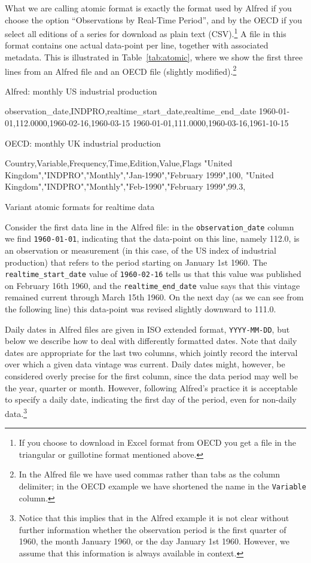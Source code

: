 What we are calling atomic format is exactly the format used by Alfred
if you choose the option ``Observations by Real-Time Period'', and by
the OECD if you select all editions of a series for download as plain
text (CSV).\footnote{If you choose to download in Excel format from
  OECD you get a file in the triangular or guillotine format mentioned
  above.} A file in this format contains one actual data-point per
line, together with associated metadata. This is illustrated in
Table~\ref{tab:atomic}, where we show the first three lines from an
Alfred file and an OECD file (slightly modified).\footnote{In the
  Alfred file we have used commas rather than tabs as the column
  delimiter; in the OECD example we have shortened the name in the
  \texttt{Variable} column.}

\begin{table}[htbp]
\begin{center}
Alfred: monthly US industrial production
\begin{code}
observation_date,INDPRO,realtime_start_date,realtime_end_date
1960-01-01,112.0000,1960-02-16,1960-03-15
1960-01-01,111.0000,1960-03-16,1961-10-15
\end{code}
OECD: monthly UK industrial production
\begin{code}
Country,Variable,Frequency,Time,Edition,Value,Flags
"United Kingdom","INDPRO","Monthly","Jan-1990","February 1999",100,
"United Kingdom","INDPRO","Monthly","Feb-1990","February 1999",99.3,
\end{code}
\end{center}
\caption{Variant atomic formats for realtime data}
\label{tab:atomic}
\end{table}

Consider the first data line in the Alfred file: in the
\verb|observation_date| column we find \texttt{1960-01-01}, indicating
that the data-point on this line, namely 112.0, is an observation or
measurement (in this case, of the US index of industrial production)
that refers to the period starting on January 1st 1960. The
\verb|realtime_start_date| value of \texttt{1960-02-16} tells us that
this value was published on February 16th 1960, and the
\verb|realtime_end_date| value says that this vintage remained current
through March 15th 1960. On the next day (as we can see from the
following line) this data-point was revised slightly downward to
111.0.

Daily dates in Alfred files are given in ISO extended format,
\texttt{YYYY-MM-DD}, but below we describe how to deal with
differently formatted dates. Note that daily dates are appropriate for
the last two columns, which jointly record the interval over which a
given data vintage was current. Daily dates might, however, be
considered overly precise for the first column, since the data period
may well be the year, quarter or month.  However, following Alfred's
practice it is acceptable to specify a daily date, indicating the
first day of the period, even for non-daily data.\footnote{Notice that
  this implies that in the Alfred example it is not clear without
  further information whether the observation period is the first
  quarter of 1960, the month January 1960, or the day January 1st
  1960.  However, we assume that this information is always available
  in context.}

